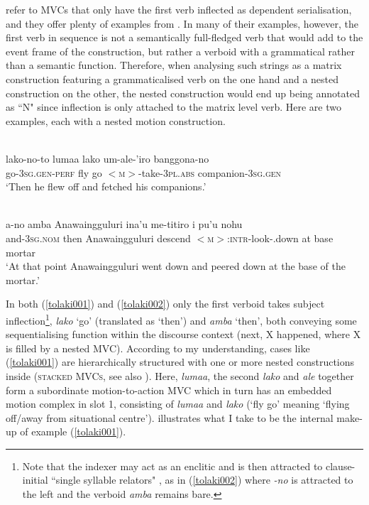 \citet{mead2008verb} refer to MVCs that only have the first verb inflected as dependent serialisation, and they offer plenty of examples from . In many of their examples, however, the first verb in sequence is not a semantically full-fledged verb that would add to the event frame of the construction, but rather a verboid with a grammatical rather than a semantic function. Therefore, when analysing such strings as a matrix construction featuring a grammaticalised verb on the one hand and a nested construction on the other, the nested construction would end up being annotated as ``N" since inflection is only attached to the matrix level verb. Here are two examples, each with a nested motion construction.

\ea \label{tolaki001}
\\
\gll lako-no-to lumaa lako um-ale-'iro banggona-no \\
go-3\textsc{sg}.\textsc{gen}-\textsc{perf} fly go $<$\textsc{m}$>$-take-3\textsc{pl}.\textsc{abs} companion-3\textsc{sg}.\textsc{gen} \\
\glft `Then he flew off and fetched his companions.' \\ 
\z

\ea \label{tolaki002}
\\
\gll a-no amba Anawaingguluri ina'u me-titiro i pu'u nohu \\
and-3\textsc{sg}.\textsc{nom} then Anawaingguluri descend $<$\textsc{m}$>$:\textsc{intr}-look-.down at base mortar \\
\glft `At that point Anawaingguluri went down and peered down at the base of the mortar.'\\ 
\z

In both (\ref{tolaki001}) and (\ref{tolaki002}) only the first verboid takes subject inflection\footnote{Note that the indexer may act as an enclitic and is then attracted to clause-initial ``single syllable relators" \citep[114]{mead2008verb}, as in (\ref{tolaki002}) where \textit{-no} is attracted to the left and the verboid \textit{amba} remains bare.}, \textit{lako} `go' (translated as `then') and \textit{amba} `then', both conveying some sequentialising function within the discourse context (next, X happened, where X is filled by a nested MVC). According to my understanding, cases like (\ref{tolaki001}) are hierarchically structured with one or more nested constructions inside (\textsc{stacked MVCs}, see also ). Here, \textit{lumaa}, the second \textit{lako} and \textit{ale} together form a subordinate motion-to-action MVC which in turn has an embedded motion complex in slot 1, consisting of \textit{lumaa} and \textit{lako} (`fly go' meaning `flying off/away from situational centre').  illustrates what I take to be the internal make-up of example (\ref{tolaki001}).

